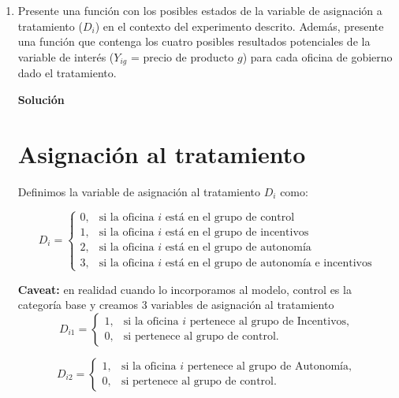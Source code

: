 \documentclass[a4paper, answers, addpoints, 11pt]{exam}
\newenvironment{solucion}{%
  \begin{mdframed}[
    backgroundcolor=blue!5,    %
    linecolor=blue!50,          %
    linewidth=2pt,              %
    leftmargin=10pt,            %
    rightmargin=10pt,           %
    topline=true,              %
    bottomline=true,            %
    roundcorner=10pt,           %
    innerleftmargin=10pt,       %
    innerrightmargin=10pt,      %
    innerbottommargin=10pt,     %
    innertopmargin=10pt         %
  ]%
  \begin{tcolorbox}[colframe=blue!50!black, colback=blue!50, coltitle=white, sharp corners=all, boxrule=1mm, width=\textwidth, halign=left, valign=center, top=0mm, bottom=0mm, left=0mm, right=0mm] \textbf{Solución} \end{tcolorbox} }{\end{mdframed}}
\begin{document}
\begin{enumerate}
  
    \item Presente una función con los posibles estados de la variable de asignación a tratamiento ($D_i$) en el contexto del experimento descrito. Además, presente una función que contenga los cuatro posibles resultados potenciales de la variable de interés ($Y_{ig}$ = precio de producto $g$) para cada oficina de gobierno dado el tratamiento. 

      
  \begin{solucion}
        \section*{Asignación al tratamiento}  
    Definimos la variable de asignación al tratamiento $D_i$ como:

\begin{equation*}
    D_i = \begin{cases}
        0, & \text{si la oficina $i$ está en el grupo de control} \\
        1, & \text{si la oficina $i$ está en el grupo de incentivos} \\
        2, & \text{si la oficina $i$ está en el grupo de autonomía} \\
        3, & \text{si la oficina $i$ está en el grupo de autonomía e incentivos}
    \end{cases}
\end{equation*}

\begin{mdframed}[backgroundcolor=moraditoClaro]
    
\textbf{Caveat:} en realidad cuando lo incorporamos al modelo, control es la categoría base y creamos 3 variables de asignación al tratamiento
\begin{equation*}
D_{i1} =
\begin{cases}
    1, & \text{si la oficina } i \text{ pertenece al grupo de Incentivos}, \\
    0, & \text{si pertenece al grupo de control}.
\end{cases}
\end{equation*}

\begin{equation*}
D_{i2} =
\begin{cases}
    1, & \text{si la oficina } i \text{ pertenece al grupo de Autonomía}, \\
    0, & \text{si pertenece al grupo de control}.
\end{cases}
\end{equation*}


\end{mdframed}
\end{solucion}
\end{enumerate}
\end{document}
